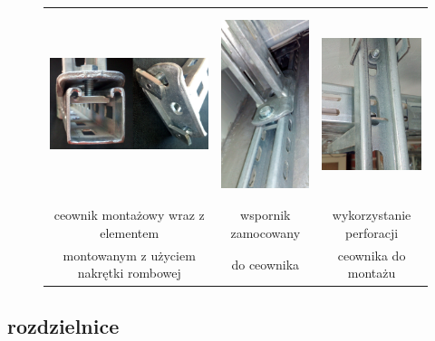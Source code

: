 \begin{figure}[ht!]
\begin{center}\begin{tabular}{ccc}
\includegraphics[height=5.5cm]{elektryka/ceowniki1.jpg} &
\includegraphics[height=5.5cm]{elektryka/ceowniki2.jpg} &
\includegraphics[height=5.5cm]{elektryka/ceowniki3.jpg}
\\
ceownik montażowy wraz z elementem &
wspornik zamocowany &
wykorzystanie perforacji 
\\
montowanym z użyciem nakrętki rombowej &
do ceownika &
ceownika do montażu
\end{tabular}\end{center}
\end{figure}

\subsection{rozdzielnice}

